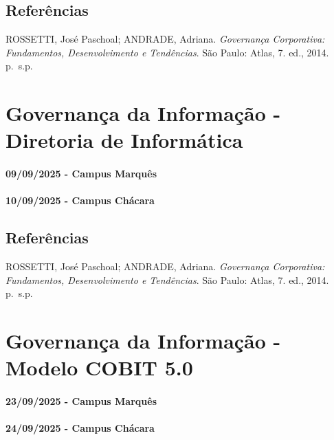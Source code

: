 \documentclass[
]{book}
\begin{document}
\section{Referências}\label{referuxeancias-3}

ROSSETTI, José Paschoal; ANDRADE, Adriana. \emph{Governança Corporativa: Fundamentos, Desenvolvimento e Tendências}. São Paulo: Atlas, 7. ed., 2014. p.~s.p.

\chapter{Governança da Informação - Diretoria de Informática}\label{governanuxe7a-da-informauxe7uxe3o---diretoria-de-informuxe1tica}

\subsubsection*{09/09/2025 - Campus Marquês}\label{campus-marquuxeas-5}

\subsubsection*{10/09/2025 - Campus Chácara}\label{campus-chuxe1cara-5}

\section{Referências}\label{referuxeancias-4}

ROSSETTI, José Paschoal; ANDRADE, Adriana. \emph{Governança Corporativa: Fundamentos, Desenvolvimento e Tendências}. São Paulo: Atlas, 7. ed., 2014. p.~s.p.

\chapter{Governança da Informação - Modelo COBIT 5.0}\label{governanuxe7a-da-informauxe7uxe3o---modelo-cobit-5.0}

\subsubsection*{23/09/2025 - Campus Marquês}\label{campus-marquuxeas-6}

\subsubsection*{24/09/2025 - Campus Chácara}\label{campus-chuxe1cara-6}
\end{document}
